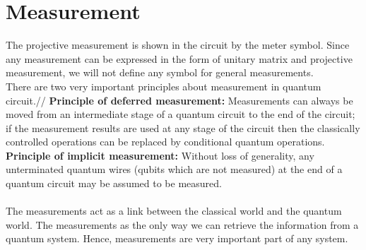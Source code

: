 \section{Measurement}
The projective measurement is shown in the circuit by the meter symbol. Since any measurement can be expressed in the form of unitary matrix and projective measurement, we will not define any symbol for general measurements. \\
There are two very important principles about measurement in quantum circuit.//
{\bf Principle of deferred measurement: }Measurements can always be moved from an intermediate stage of a quantum circuit to the end of the circuit; if the measurement results are used at any stage of the circuit then the classically controlled operations can be replaced by conditional quantum operations.\\
{\bf Principle of implicit measurement: }Without loss of generality, any unterminated quantum wires (qubits which are not measured) at the end of a quantum circuit may be assumed to be measured.\\\\
The measurements act as a link between the classical world and the quantum world. The measurements as the only way we can retrieve the information from a quantum system. Hence, measurements are very important part of any system.  
\newpage
